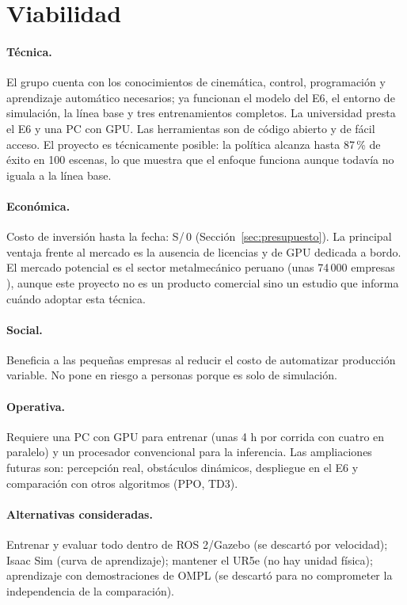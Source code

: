 \documentclass[11pt,a4paper,twoside]{article}
\begin{document}
\section{Viabilidad}

\paragraph{Técnica.} El grupo cuenta con los conocimientos de cinemática, control, programación y aprendizaje automático necesarios; ya funcionan el modelo del E6, el entorno de simulación, la línea base y tres entrenamientos completos. La universidad presta el E6 y una PC con GPU. Las herramientas son de código abierto y de fácil acceso. El proyecto es técnicamente posible: la política alcanza hasta 87\,\% de éxito en 100 escenas, lo que muestra que el enfoque funciona aunque todavía no iguala a la línea base.

\paragraph{Económica.} Costo de inversión hasta la fecha: S/\,0 (Sección~\ref{sec:presupuesto}). La principal ventaja frente al mercado es la ausencia de licencias y de GPU dedicada a bordo. El mercado potencial es el sector metalmecánico peruano (unas 74\,000 empresas \cite{produce2025}), aunque este proyecto no es un producto comercial sino un estudio que informa cuándo adoptar esta técnica.

\paragraph{Social.} Beneficia a las pequeñas empresas al reducir el costo de automatizar producción variable. No pone en riesgo a personas porque es solo de simulación.

\paragraph{Operativa.} Requiere una PC con GPU para entrenar (unas 4 h por corrida con cuatro en paralelo) y un procesador convencional para la inferencia. Las ampliaciones futuras son: percepción real, obstáculos dinámicos, despliegue en el E6 y comparación con otros algoritmos (PPO, TD3).

\paragraph{Alternativas consideradas.} Entrenar y evaluar todo dentro de ROS 2/Gazebo (se descartó por velocidad); Isaac Sim (curva de aprendizaje); mantener el UR5e (no hay unidad física); aprendizaje con demostraciones de OMPL (se descartó para no comprometer la independencia de la comparación).
\end{document}
